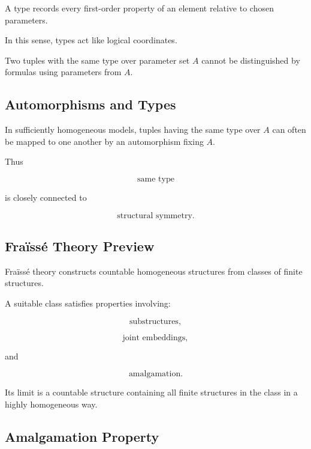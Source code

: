 A type records every first-order property of an element relative to chosen
parameters.

In this sense, types act like logical coordinates.

Two tuples with the same type over parameter set \(A\) cannot be
distinguished by formulas using parameters from \(A\).

\subsection{Automorphisms and Types}
\label{subsec:automorphisms-and-types}

In sufficiently homogeneous models, tuples having the same type over \(A\)
can often be mapped to one another by an automorphism fixing \(A\).

Thus

\[
\boxed{
\text{same type}
}
\]

is closely connected to

\[
\boxed{
\text{structural symmetry}.
}
\]

\subsection{Fraïssé Theory Preview}
\label{subsec:fraisse-theory-preview}

Fraïssé theory constructs countable homogeneous structures from classes of
finite structures.

A suitable class satisfies properties involving:

\[
\boxed{
\text{substructures},
}
\]

\[
\boxed{
\text{joint embeddings},
}
\]

and

\[
\boxed{
\text{amalgamation}.
}
\]

Its limit is a countable structure containing all finite structures in the
class in a highly homogeneous way.

\subsection{Amalgamation Property}
\label{subsec:amalgamation-property}


